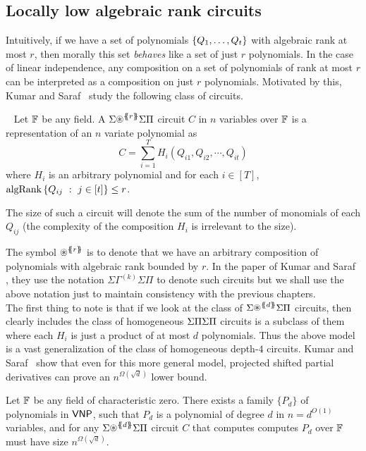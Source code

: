 \subsection{Locally low algebraic rank circuits}


Intuitively, if we have a set of polynomials $\left\{Q_1,\ldots, Q_t\right\}$ with algebraic rank at most $r$, then morally this set \emph{behaves} like a set of just $r$ polynomials. In the case of linear independence, any composition on a set of polynomials of rank at most $r$ can be interpreted as a composition on just $r$ polynomials. Motivated by this, Kumar and Saraf~\cite{KS16lowrank} study the following class of circuits. 

\begin{definition}~\label{def:lb model}
Let $\mathbb{F}$ be any field. A $\SASP{r}$ circuit $C$ in $n$ variables over $\mathbb{F}$ is a representation of an $n$ variate polynomial as 
\[C =  \sum_{i = 1}^T  H_i(Q_{i1},  Q_{i2},  \cdots, Q_{it}) \]  
where $H_i$ is an arbitrary polynomial and for each $i\in [T]$, $\operatorname{\mathrm{algRank}}\left\{{Q_{ij}}\ : \ {j\in [t]}\right\} \leq r$. 

The size of such a circuit will denote the sum of the number of monomials of each $Q_{ij}$ (the complexity of the composition $H_i$ is irrelevant to the size). 
\end{definition}

The symbol $\circast^{\set{\!\!\set{r}\!\!}}$ is to denote that we have an arbitrary composition of polynomials with algebraic rank bounded by $r$.
In the paper of Kumar and Saraf \cite{KS16lowrank}, they use the notation $\Sigma\Gamma^{(k)}\Sigma\Pi$ to denote such circuits but we shall use the above notation just to maintain consistency with the previous chapters. \\

The first thing to note is that if we look at the class of $\SASP{d}$ circuits, then clearly includes the class of homogeneous $\Sigma\Pi\Sigma\Pi$ circuits is a subclass of them where each $H_i$ is just a product of at most $d$ polynomials. Thus the above model is a vast generalization of the class of homogeneous depth-$4$ circuits. Kumar and Saraf~\cite{KS16lowrank} show that even for this more general model, projected shifted partial derivatives can prove an $n^{\Omega(\sqrt{d})}$ lower bound. 

\begin{theorem} \label{thm:locally-lowalgrank}
Let $\mathbb{F}$ be any field of characteristic zero. There exists a family $\{P_d\}$ of polynomials in $\mathsf{VNP}$, such that $P_d$ is a polynomial of degree $d$ in $n = d^{O(1)}$ variables, and for any $\SASP{d}$ circuit $C$ that computes computes $P_d$ over $\mathbb{F}$ must have size $n^{\Omega(\sqrt{d})}$.
\end{theorem} 


